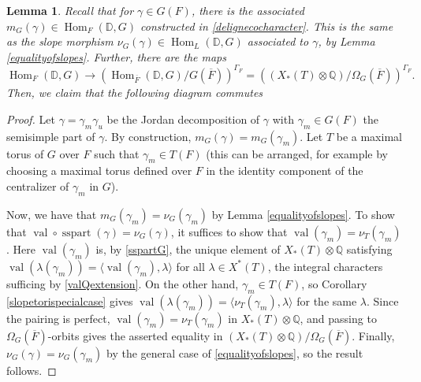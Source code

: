 \documentclass[11pt,a4paper]{article}
\theoremstyle{definition}
\theoremstyle{plain}
\newtheorem{Le}[shared]{Lemma}
\theoremstyle{remark}
\theoremstyle{plain}
\DeclareMathOperator{\Hom}{Hom}
\DeclareMathOperator{\val}{val}
\DeclareMathOperator{\semisimplepart}{sspart}
\begin{document}
\begin{Le}\label{slopeconstruction3}
    Recall that for $\gamma \in G(F)$, there is the associated $m_G(\gamma) \in \Hom_F(\mathbb{D}, G)$ constructed in \ref{delignecocharacter}. This is the same as the slope morphism $\nu_G(\gamma) \in \Hom_L(\mathbb{D},G)$ associated to $\gamma$, by Lemma \ref{equalityofslopes}. Further, there are the maps
    $$ \Hom_F(\mathbb{D},G) \xrightarrow[]{} (\Hom_{\overline{F}}(\mathbb{D},G)/G(\overline{F}))^{\Gamma_F} = ((X_*(T) \otimes \mathbb{Q})/\Omega_G(\overline{F}))^{\Gamma_F}. $$
    Then, we claim that the following diagram commutes
    \begin{center}
    \end{center}
\end{Le}
\begin{proof}
    Let $\gamma = \gamma_m \gamma_u$ be the Jordan decomposition of $\gamma$ with $\gamma_m \in G(F)$ the semisimple part of $\gamma$. By construction, $m_G(\gamma) = m_G(\gamma_m)$. Let $T$ be a maximal torus of $G$ over $F$ such that $\gamma_m \in T(F)$ (this can be arranged, for example by choosing a maximal torus defined over $F$ in the identity component of the centralizer of $\gamma_m$ in $G$).
    
    Now, we have that $m_G(\gamma_m) = \nu_G(\gamma_m)$ by Lemma \ref{equalityofslopes}. To show that $\val \circ \semisimplepart (\gamma) = \nu_G(\gamma)$, it suffices to show that $\val(\gamma_m) = \nu_T(\gamma_m)$. Here $\val(\gamma_m)$ is, by \ref{sspartG}, the unique element of $X_*(T)\otimes \mathbb{Q}$ satisfying $\val(\lambda(\gamma_m)) = \langle \val(\gamma_m), \lambda \rangle$ for all $\lambda \in X^*(T)$, the integral characters sufficing by \ref{valQextension}. On the other hand, $\gamma_m \in T(F)$, so Corollary \ref{slopetorispecialcase} gives $\val(\lambda(\gamma_m)) = \langle \nu_T(\gamma_m), \lambda \rangle$ for the same $\lambda$. Since the pairing is perfect, $\val(\gamma_m) = \nu_T(\gamma_m)$ in $X_*(T) \otimes \mathbb{Q}$, and passing to $\Omega_G(\overline{F})$-orbits gives the asserted equality in $(X_*(T)\otimes \mathbb{Q})/\Omega_G(\overline{F})$. Finally, $\nu_G(\gamma) = \nu_G(\gamma_m)$ by the general case of \ref{equalityofslopes}, so the result follows.
\end{proof}
\end{document}

